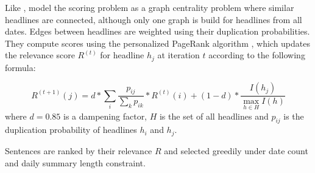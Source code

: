 \documentclass[a4paper,BCOR=10mm]{report}
\numberwithin{lemma}{chapter}
\numberwithin{definition}{chapter}
\begin{document}
Like \citet{yan-trans}, \citet{tran-headlines} model the scoring problem as a graph centrality problem where similar headlines are connected, although only one graph is build for headlines from all dates.
Edges between headlines are weighted using their duplication probabilities.
They compute scores using the personalized PageRank algorithm \citep{topic-sensitive-pagerank}, which updates the relevance score $R^{(t)}$ for headline $h_j$ at iteration $t$ according to the following formula:

\begin{equation}
R^{(t + 1)}(j) = d * \sum_{i} \frac{p_{ij}}{\sum_{k} p_{ik}} * R^{(t)}(i) + (1 - d) * \frac{I(h_j)}{\max_{h \in H} I(h)}
\end{equation}
where $d = 0.85$ is a dampening factor, $H$ is the set of all headlines and $p_{ij}$ is the duplication probability of headlines $h_i$ and $h_j$.

Sentences are ranked by their relevance $R$ and selected greedily under date count and daily summary length constraint.




\end{document}
